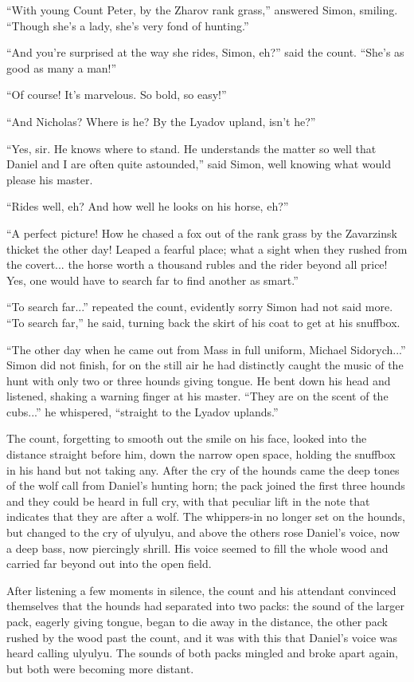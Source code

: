 ``With young Count Peter, by the Zharov rank grass,'' answered
Simon, smiling. ``Though she's a lady, she's very fond of
hunting.''

``And you're surprised at the way she rides, Simon, eh?'' said
the count.  ``She's as good as many a man!''

``Of course! It's marvelous. So bold, so easy!''

``And Nicholas? Where is he? By the Lyadov upland, isn't he?''

``Yes, sir. He knows where to stand. He understands the matter so
well that Daniel and I are often quite astounded,'' said Simon,
well knowing what would please his master.

``Rides well, eh? And how well he looks on his horse, eh?''

``A perfect picture! How he chased a fox out of the rank grass by
the Zavarzinsk thicket the other day! Leaped a fearful place;
what a sight when they rushed from the covert... the horse worth
a thousand rubles and the rider beyond all price! Yes, one would
have to search far to find another as smart.''

``To search far...'' repeated the count, evidently sorry Simon
had not said more. ``To search far,'' he said, turning back the
skirt of his coat to get at his snuffbox.

``The other day when he came out from Mass in full uniform,
Michael Sidorych...'' Simon did not finish, for on the still air
he had distinctly caught the music of the hunt with only two or
three hounds giving tongue. He bent down his head and listened,
shaking a warning finger at his master. ``They are on the scent
of the cubs...'' he whispered, ``straight to the Lyadov
uplands.''

The count, forgetting to smooth out the smile on his face, looked
into the distance straight before him, down the narrow open
space, holding the snuffbox in his hand but not taking any. After
the cry of the hounds came the deep tones of the wolf call from
Daniel's hunting horn; the pack joined the first three hounds and
they could be heard in full cry, with that peculiar lift in the
note that indicates that they are after a wolf. The whippers-in
no longer set on the hounds, but changed to the cry of ulyulyu,
and above the others rose Daniel's voice, now a deep bass, now
piercingly shrill. His voice seemed to fill the whole wood and
carried far beyond out into the open field.

After listening a few moments in silence, the count and his
attendant convinced themselves that the hounds had separated into
two packs: the sound of the larger pack, eagerly giving tongue,
began to die away in the distance, the other pack rushed by the
wood past the count, and it was with this that Daniel's voice was
heard calling ulyulyu. The sounds of both packs mingled and broke
apart again, but both were becoming more distant.

